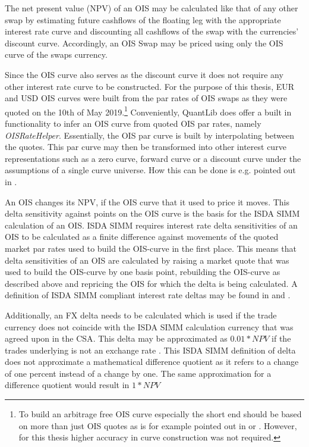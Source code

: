 \documentclass[../Thesis_AHoecherl.tex]{subfiles}
\begin{document}
    The net present value (\gls{NPV}) of an \gls{OIS} may be calculated like that of any other swap by estimating future cashflows of the floating leg with the appropriate interest rate curve and discounting all cashflows of the swap with the currencies' discount curve.
    Accordingly, an \gls{OIS} Swap may be priced using only the \gls{OIS} curve of the swaps currency.

    Since the \gls{OIS} curve also serves as the discount curve it does not require any other interest rate curve to be constructed. 
    For the purpose of this thesis, EUR and USD \gls{OIS} curves were built from the par rates of \gls{OIS} swaps as they were quoted on the 10th of May 2019.\footnote{To build an arbitrage free \gls{OIS} curve especially the short end should be based on more than just \gls{OIS} quotes as is for example pointed out in \cite{ametrano2013everything} or \cite{brugger2018valuation}. However, for this thesis higher accuracy in curve construction was not required.}
    Conveniently, QuantLib does offer a built in functionality to infer an \gls{OIS} curve from quoted \gls{OIS} par rates, namely \emph{OISRateHelper}. Essentially, the \gls{OIS} par curve is built by interpolating between the quotes.
    This par curve may then be transformed into other interest curve representations such as a zero curve, forward curve or a discount curve under the assumptions of a single curve universe. How this can be done is e.g. pointed out in \cite[Chapter 4]{hull2009options}.

    An \gls{OIS} changes its \gls{NPV}, if the \gls{OIS} curve that it used to price it moves.
    This delta sensitivity against points on the \gls{OIS} curve is the basis for the \gls{ISDA SIMM} calculation of an \gls{OIS}.
    \gls{ISDA SIMM} requires interest rate delta sensitivities of an \gls{OIS} to be calculated as a finite difference against movements of the quoted market par rates used to build the \gls{OIS}-curve in the first place. 
    This means that delta sensitivities of an \gls{OIS} are calculated by raising a market quote that was used to build the \gls{OIS}-curve by one basis point, rebuilding the \gls{OIS}-curve as described above and repricing the \gls{OIS} for which the delta is being calculated.
    A definition of \gls{ISDA SIMM} compliant interest rate deltas may be found in \cite[Point 22]{SIMM} and \cite[Section 2.2]{RiskDataStandard}.
    
    Additionally, an FX delta needs to be calculated which is used if the trade currency does not coincide with the \gls{ISDA SIMM} calculation currency that was agreed upon in the \gls{CSA}. This delta may be approximated as $0.01 * NPV$ if the trades underlying is not an exchange rate \cite[Section 2.7]{RiskDataStandard}. This \gls{ISDA SIMM} definition of delta does not approximate a mathematical difference quotient as it refers to a change of one percent instead of a change by one. The same approximation for a difference quotient would result in $1 * NPV$ 
\end{document}
